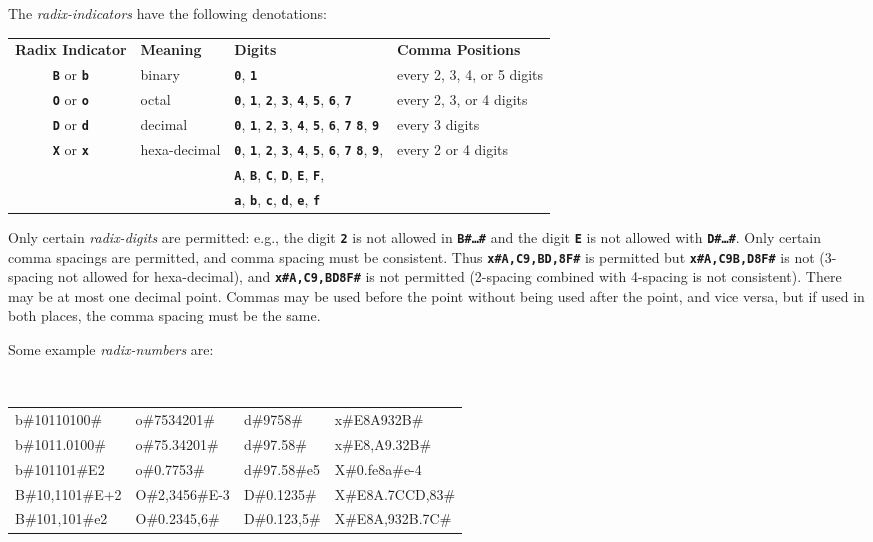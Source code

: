 \documentclass[12pt]{article}
\newcommand{\TT}[1]{{\tt \bfseries #1}}
\newenvironment{indpar}[1][0.3in]%
	{\begin{list}{}%
		     {\setlength{\itemsep}{0in}%
		      \setlength{\topsep}{0in}%
		      \setlength{\parsep}{1ex}%
		      \setlength{\labelwidth}{#1}%
		      \setlength{\leftmargin}{#1}%
		      \addtolength{\leftmargin}{\labelsep}}%
	 \item}%
	{\end{list}}
\begin{document}
The {\em radix-indicators} have the following denotations:

\begin{center}
\begin{tabular}{clll}
\bf Radix Indicator
	& \bf Meaning	& \bf Digits 		& \bf Comma Positions
\\[1ex]
\TT{B} or \TT{b}
        & binary	& \TT{0}, \TT{1}	& every 2, 3, 4, or 5 digits \\
\TT{O} or \TT{o}
        & octal		& \TT{0}, \TT{1}, \TT{2}, \TT{3},
			  \TT{4}, \TT{5}, \TT{6}, \TT{7}
			  			& every 2, 3, or 4 digits \\
\TT{D} or \TT{d}
        & decimal	& \TT{0}, \TT{1}, \TT{2}, \TT{3},
			  \TT{4}, \TT{5}, \TT{6}, \TT{7}
			  \TT{8}, \TT{9}	& every 3 digits \\
\TT{X} or \TT{x}
        & hexa-decimal	& \TT{0}, \TT{1}, \TT{2}, \TT{3},
			  \TT{4}, \TT{5}, \TT{6}, \TT{7}
			  \TT{8}, \TT{9},	& every 2 or 4 digits \\
	&		& \TT{A}, \TT{B}, \TT{C}, \TT{D},
			  \TT{E}, \TT{F}, \\
	&		& \TT{a}, \TT{b}, \TT{c}, \TT{d},
			  \TT{e}, \TT{f} \\
\end{tabular}
\end{center}

Only certain {\em radix-digits} are permitted: e.g., the digit \TT{2}
is not allowed in \TT{B\#\ldots\#} and the digit \TT{E} is not allowed
with \TT{D\#\ldots\#}.  Only certain comma spacings are permitted, and comma
spacing must be consistent.  Thus \TT{x\#A,C9,BD,8F\#} is permitted but
\TT{x\#A,C9B,D8F\#} is not (3-spacing not allowed for hexa-decimal),
and \TT{x\#A,C9,BD8F\#} is not permitted (2-spacing combined with
4-spacing is not consistent).
There may be at most one decimal point.
Commas may be used before the point without being used after the
point, and vice versa, but if used in both places, the comma spacing
must be the same.

Some example {\em radix-numbers} are:

\begin{indpar}[0.1in]
\tt
\begin{tabular}{@{}l@{~~}l@{~~}l@{~~}l@{}}
b\#10110100\#	& o\#7534201\#   & d\#9758\#	& x\#E8A932B\# \\
b\#1011.0100\#	& o\#75.34201\#  & d\#97.58\#	& x\#E8,A9.32B\# \\
b\#101101\#E2	& o\#0.7753\#    & d\#97.58\#e5	& X\#0.fe8a\#e-4 \\
B\#10,1101\#E+2	& O\#2,3456\#E-3 & D\#0.1235\#	& X\#E8A.7CCD,83\# \\
B\#101,101\#e2	& O\#0.2345,6\#  & D\#0.123,5\#	& X\#E8A,932B.7C\# \\
\end{tabular}
\end{indpar}
\end{document}
